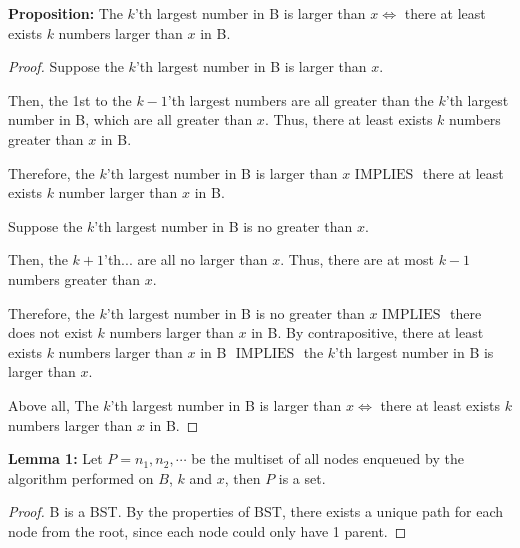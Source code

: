 \documentclass[10pt]{article}
\newcommand{\iimplies}{\mbox{ IMPLIES }}
\begin{document}
\begin{enumerate}
\begin{addmargin}[1em]{0em}
    \textbf{Proposition:} The $k$'th largest number in B is larger than $x
    \iff$ there at least exists $k$ numbers larger than $x$ in B.
    
    \begin{proof}
        Suppose the $k$'th largest number in B is larger than $x$.
        \begin{addmargin}[1em]{0em}
            Then, the 1st to the $k-1$'th largest numbers are all greater than
            the $k$'th largest number in B, which are all greater than $x$.
            Thus, there at least exists $k$ numbers greater than $x$ in B.
        \end{addmargin}
        Therefore, the $k$'th largest number in B is larger than $x \iimplies$
        there at least exists $k$ number larger than $x$ in B.

        Suppose the $k$'th largest number in B is no greater than $x$.
        \begin{addmargin}[1em]{0em}
            Then, the $k+1$'th... are all no larger than $x$.
            Thus, there are at most $k-1$ numbers greater than $x$.
        \end{addmargin}
        Therefore, the $k$'th largest number in B is no greater than $x
        \iimplies$ there does not exist $k$ numbers larger than $x$ in B.
        By contrapositive, there at least exists $k$ numbers larger than $x$ in
        B $\iimplies$ the $k$'th largest number in B is larger than $x$.

        Above all, The $k$'th largest number in B is larger than $x \iff$ there
        at least exists $k$ numbers larger than $x$ in B.
    \end{proof}
\end{addmargin}

\begin{addmargin}[1em]{0em}
    \textbf{Lemma 1:} Let $P={n_1,n_2, \cdots}$ be the multiset of all nodes
    enqueued by the algorithm performed on $B$, $k$ and $x$, then $P$ is a set.
    \begin{proof}
        B is a BST.
        By the properties of BST, there exists a unique path for each node from
        the root, since each node could only have 1 parent.
    \end{proof}
\end{addmargin}



\end{enumerate}
\end{document}

